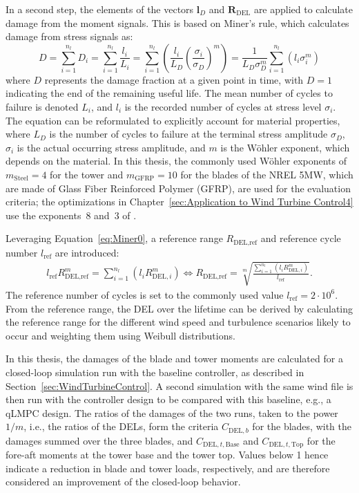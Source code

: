 In a second step, the elements of the vectors $\bm{l}_D$ and $\bm{R}_{\text{DEL}}$ are applied to calculate damage from the moment signals. This is based on Miner’s rule, which calculates damage from stress signals as:
\begin{equation} \label{eq:Miner0}
    D =  \sum_{i=1}^{n_l} D_i = \sum_{i=1}^{n_l} \frac{l_i}{L_i} = 
    \sum_{i=1}^{n_l} \left( \frac{l_i}{L_D} \left(\frac{\sigma_i}{\sigma_D} \right)^m \right)
    = \frac{1}{L_D\sigma_D^m} \sum_{i=1}^{n_l}  \left( l_i \sigma_i^m \right)
\end{equation}
where $D$ represents the damage fraction at a given point in time, with $D = 1$ indicating the end of the remaining useful life. The mean number of cycles to failure is denoted $L_i$, and $l_i$ is the recorded number of cycles at stress level $\sigma_i$. The equation can be reformulated to explicitly account for material properties, where $L_D$ is the number of cycles to failure at the terminal stress amplitude $\sigma_D$, $\sigma_i$ is the actual occurring stress amplitude, and $m$ is the W\"ohler exponent, which depends on the material. In this thesis, the commonly used W\"ohler exponents of $m_{\text{Steel}} = 4$ for the tower and $m_{\text{GFRP}} = 10$ for the blades of the NREL 5MW, which are made of Glass Fiber Reinforced Polymer (GFRP), are used for the evaluation criteria; the optimizations in Chapter~\ref{sec:Application to Wind Turbine Control4} use the exponents~8 and~3 of \cite{dittmer2024combined}.

Leveraging Equation~\eqref{eq:Miner0}, a reference range $R_{\text{DEL},\text{ref}}$ and reference cycle number $l_{\text{ref}}$ are introduced:
\begin{align}
    l_{\text{ref}} R_{\text{DEL},\text{ref}} ^m = \sum_{i=1}^{n_l}  \left(l_i R_{\text{DEL},i}^m \right) \iff R_{\text{DEL},\text{ref}} = \sqrt[m]{\frac{ \sum_{i=1}^{n_l} \left(l_i R_{\text{DEL},i}^m \right)}{l_{\text{ref}}}}.
\end{align}
The reference number of cycles is set to the commonly used value $l_{\text{ref}}=2\cdot10^6$. From the reference range, the DEL over the lifetime can be derived by calculating the reference range for the different wind speed and turbulence scenarios likely to occur and weighting them using Weibull distributions.

In this thesis, the damages of the blade and tower moments are calculated for a closed-loop simulation run with the baseline controller, as described in Section~\ref{sec:WindTurbineControl}. A second simulation with the same wind file is then run with the controller design to be compared with this baseline, e.g., a qLMPC design. The ratios of the damages of the two runs, taken to the power $1/m$, i.e., the ratios of the DELs, form the criteria $C_{\text{DEL},b}$ for the blades, with the damages summed over the three blades, and $C_{\text{DEL},t,\text{Base}}$ and $C_{\text{DEL},t,\text{Top}}$ for the fore-aft moments at the tower base and the tower top. Values below 1 hence indicate a reduction in blade and tower loads, respectively, and are therefore considered an improvement of the closed-loop behavior.


